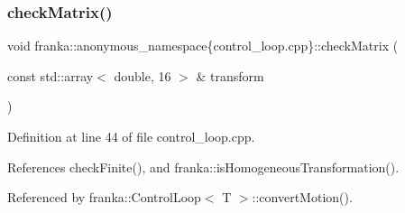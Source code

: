 \subsubsection{\texorpdfstring{check\+Matrix()}{checkMatrix()}}
{\footnotesize\ttfamily void franka\+::anonymous\+\_\+namespace\{control\+\_\+loop.\+cpp\}\+::check\+Matrix (\begin{DoxyParamCaption}\item[{const std\+::array$<$ double, 16 $>$ \&}]{transform }\end{DoxyParamCaption})\hspace{0.3cm}{\ttfamily [inline]}}



Definition at line 44 of file control\+\_\+loop.\+cpp.



References check\+Finite(), and franka\+::is\+Homogeneous\+Transformation().



Referenced by franka\+::\+Control\+Loop$<$ T $>$\+::convert\+Motion().


